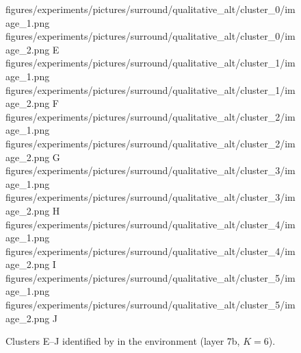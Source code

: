 \begin{figure}[H]
    \qualitativeClusterFigureSetup
    \qualitativeClusterTwo
        {figures/experiments/pictures/surround/qualitative_alt/cluster_0/image_1.png}
        {figures/experiments/pictures/surround/qualitative_alt/cluster_0/image_2.png}
        {E}
    \qualitativeClusterTwo
        {figures/experiments/pictures/surround/qualitative_alt/cluster_1/image_1.png}
        {figures/experiments/pictures/surround/qualitative_alt/cluster_1/image_2.png}
        {F}
    \qualitativeClusterTwo
        {figures/experiments/pictures/surround/qualitative_alt/cluster_2/image_1.png}
        {figures/experiments/pictures/surround/qualitative_alt/cluster_2/image_2.png}
        {G}
    \qualitativeClusterTwo
        {figures/experiments/pictures/surround/qualitative_alt/cluster_3/image_1.png}
        {figures/experiments/pictures/surround/qualitative_alt/cluster_3/image_2.png}
        {H}
    \qualitativeClusterTwo
        {figures/experiments/pictures/surround/qualitative_alt/cluster_4/image_1.png}
        {figures/experiments/pictures/surround/qualitative_alt/cluster_4/image_2.png}
        {I}
    \qualitativeClusterTwo
        {figures/experiments/pictures/surround/qualitative_alt/cluster_5/image_1.png}
        {figures/experiments/pictures/surround/qualitative_alt/cluster_5/image_2.png}
        {J}
    \caption{Clusters E--J identified by  in the \SurroundName environment (layer 7b, $K=6$).}
    \label{fig:qualitative_surround_alt}
\end{figure}
